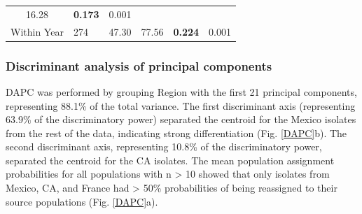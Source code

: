 \begin{longtable}[]{@{}clrllc@{}}
\begin{minipage}[t]{0.13\columnwidth}
16.28\strut
\end{minipage} & \begin{minipage}[t]{0.19\columnwidth}\raggedright\strut
\textbf{0.173}\strut
\end{minipage} & \begin{minipage}[t]{0.07\columnwidth}\centering\strut
0.001\strut
\end{minipage}\tabularnewline
\begin{minipage}[t]{0.32\columnwidth}\centering\strut
Within Year\strut
\end{minipage} & \begin{minipage}[t]{0.06\columnwidth}\raggedright\strut
274\strut
\end{minipage} & \begin{minipage}[t]{0.07\columnwidth}\raggedleft\strut
47.30\strut
\end{minipage} & \begin{minipage}[t]{0.13\columnwidth}\raggedright\strut
77.56\strut
\end{minipage} & \begin{minipage}[t]{0.19\columnwidth}\raggedright\strut
\textbf{0.224}\strut
\end{minipage} & \begin{minipage}[t]{0.07\columnwidth}\centering\strut
0.001\strut
\end{minipage}\tabularnewline
\bottomrule
\end{longtable}

\newpage

\subsubsection*{Discriminant analysis of principal
components}\label{discriminant-analysis-of-principal-components}

DAPC was performed by grouping Region with the first 21 principal
components, representing 88.1\% of the total variance. The first
discriminant axis (representing 63.9\% of the discriminatory power)
separated the centroid for the Mexico isolates from the rest of the
data, indicating strong differentiation (Fig. \ref{DAPC}b). The second
discriminant axis, representing 10.8\% of the discriminatory power,
separated the centroid for the CA isolates. The mean population
assignment probabilities for all populations with n \textgreater{} 10
showed that only isolates from Mexico, CA, and France had \textgreater{}
50\% probabilities of being reassigned to their source populations (Fig.
\ref{DAPC}a).

